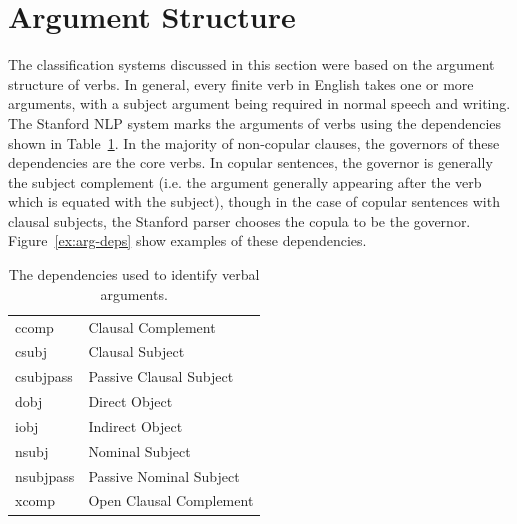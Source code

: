 \documentclass[main.tex]{subfiles}
\begin{document}
\section{Argument Structure}

The classification systems discussed in this section were based on the argument structure of verbs. In general, every finite verb in English takes one or more arguments, with a subject argument being required in normal speech and writing. The Stanford NLP system marks the arguments of verbs using the dependencies shown in Table~\ref{table:arg-deps}. In the majority of non-copular clauses, the governors of these dependencies are the core verbs. In copular sentences, the governor is generally the subject complement (i.e. the argument generally appearing after the verb which is equated with the subject), though in the case of copular sentences with clausal subjects, the Stanford parser chooses the copula to be the governor.
Figure~\ref{ex:arg-deps} show examples of these dependencies.

\begin{table}[ht]
\small
\centering
\caption{The dependencies used to identify verbal arguments.}
\begin{tabular}{ l l }
\toprule
ccomp & Clausal Complement\\
csubj & Clausal Subject\\
csubjpass & Passive Clausal Subject\\
dobj & Direct Object\\
iobj & Indirect Object \\
nsubj & Nominal Subject\\
nsubjpass & Passive Nominal Subject\\
xcomp & Open Clausal Complement\\

\bottomrule
\end{tabular}
\label{table:arg-deps}
\end{table}
\end{document}
